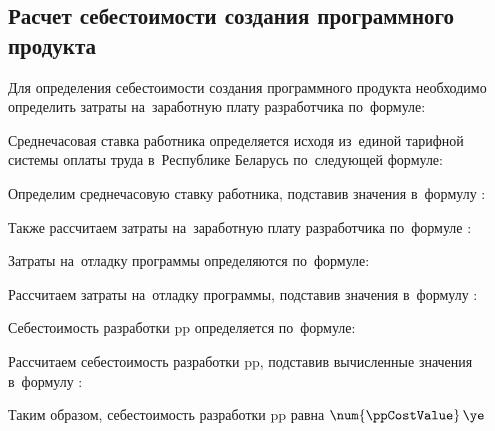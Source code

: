 \subsection{Расчет себестоимости создания программного продукта}
\label{sec:economics:pppurecost}

Для определения себестоимости создания программного продукта необходимо определить затраты на~заработную плату разработчика по~формуле:
\developerHourPriceEquation

Среднечасовая ставка работника определяется исходя из~единой тарифной системы оплаты труда в~Республике Беларусь по~следующей формуле:
\developerHourRateEquation

Определим среднечасовую ставку работника, подставив значения в~формулу :
\developerHourRateFormulaApplied

Также рассчитаем затраты на~заработную плату разработчика по~формуле :
\developerHourPriceFormulaApplied

Затраты на~отладку программы определяются по~формуле:
\softwareDebugCostEquation

Рассчитаем затраты на~отладку программы, подставив значения в~формулу :
\softwareDebugCostFormulaApplied

Себестоимость разработки \gls{pp} определяется по~формуле:
\ppCostEquation

Рассчитаем себестоимость разработки \gls{pp}, подставив вычисленные значения в~формулу :
\ppCostFormulaApplied

Таким образом, себестоимость разработки \gls{pp} равна \(\num{\ppCostValue} \, \ye\)